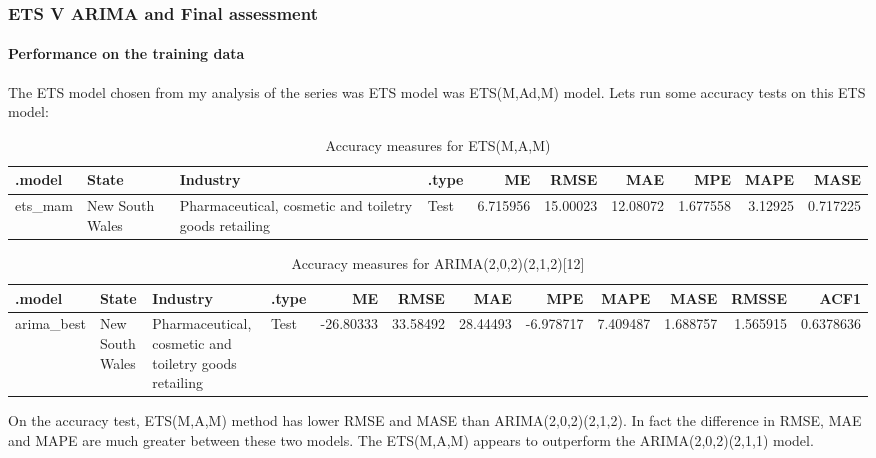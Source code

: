 \documentclass[
]{article}
\begin{document}
\hypertarget{ets-v-arima-and-final-assessment}{%
\subsubsection{ETS V ARIMA and Final
assessment}\label{ets-v-arima-and-final-assessment}}

\hypertarget{performance-on-the-training-data}{%
\paragraph{Performance on the training
data}\label{performance-on-the-training-data}}

The ETS model chosen from my analysis of the series was ETS model was
ETS(M,Ad,M) model. Lets run some accuracy tests on this ETS model:

\begin{table}

\caption{\label{tab:unnamed-chunk-28}Accuracy measures for ETS(M,A,M)}
\centering
\begin{tabular}[t]{l|l|l|l|r|r|r|r|r|r}
\hline
.model & State & Industry & .type & ME & RMSE & MAE & MPE & MAPE & MASE\\
\hline
ets\_mam & New South Wales & Pharmaceutical, cosmetic and toiletry goods retailing & Test & 6.715956 & 15.00023 & 12.08072 & 1.677558 & 3.12925 & 0.717225\\
\hline
\end{tabular}
\end{table}

\begin{table}

\caption{\label{tab:unnamed-chunk-28}Accuracy measures for ARIMA(2,0,2)(2,1,2)[12]}
\centering
\begin{tabular}[t]{l|l|l|l|r|r|r|r|r|r|r|r}
\hline
.model & State & Industry & .type & ME & RMSE & MAE & MPE & MAPE & MASE & RMSSE & ACF1\\
\hline
arima\_best & New South Wales & Pharmaceutical, cosmetic and toiletry goods retailing & Test & -26.80333 & 33.58492 & 28.44493 & -6.978717 & 7.409487 & 1.688757 & 1.565915 & 0.6378636\\
\hline
\end{tabular}
\end{table}

On the accuracy test, ETS(M,A,M) method has lower RMSE and MASE than
ARIMA(2,0,2)(2,1,2). In fact the difference in RMSE, MAE and MAPE are
much greater between these two models. The ETS(M,A,M) appears to
outperform the ARIMA(2,0,2)(2,1,1) model.
\end{document}
